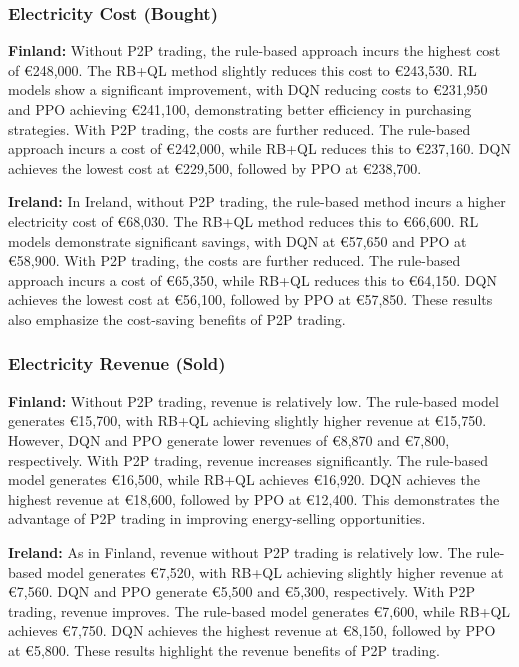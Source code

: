 \documentclass[preprint,12pt]{elsarticle}
\begin{document}
\subsubsection{Electricity Cost (Bought)}

\textbf{Finland:}  
Without P2P trading, the rule-based approach incurs the highest cost of €248,000. The RB+QL method slightly reduces this cost to €243,530. RL models show a significant improvement, with DQN reducing costs to €231,950 and PPO achieving €241,100, demonstrating better efficiency in purchasing strategies.  
With P2P trading, the costs are further reduced. The rule-based approach incurs a cost of €242,000, while RB+QL reduces this to €237,160. DQN achieves the lowest cost at €229,500, followed by PPO at €238,700.

\textbf{Ireland:}  
In Ireland, without P2P trading, the rule-based method incurs a higher electricity cost of €68,030. The RB+QL method reduces this to €66,600. RL models demonstrate significant savings, with DQN at €57,650 and PPO at €58,900.  
With P2P trading, the costs are further reduced. The rule-based approach incurs a cost of €65,350, while RB+QL reduces this to €64,150. DQN achieves the lowest cost at €56,100, followed by PPO at €57,850. These results also emphasize the cost-saving benefits of P2P trading.

\subsubsection{Electricity Revenue (Sold)}

\textbf{Finland:}  
Without P2P trading, revenue is relatively low. The rule-based model generates €15,700, with RB+QL achieving slightly higher revenue at €15,750. However, DQN and PPO generate lower revenues of €8,870 and €7,800, respectively.  
With P2P trading, revenue increases significantly. The rule-based model generates €16,500, while RB+QL achieves €16,920. DQN achieves the highest revenue at €18,600, followed by PPO at €12,400. This demonstrates the advantage of P2P trading in improving energy-selling opportunities.

\textbf{Ireland:}  
As in Finland, revenue without P2P trading is relatively low. The rule-based model generates €7,520, with RB+QL achieving slightly higher revenue at €7,560. DQN and PPO generate €5,500 and €5,300, respectively.  
With P2P trading, revenue improves. The rule-based model generates €7,600, while RB+QL achieves €7,750. DQN achieves the highest revenue at €8,150, followed by PPO at €5,800. These results highlight the revenue benefits of P2P trading.
\end{document}
